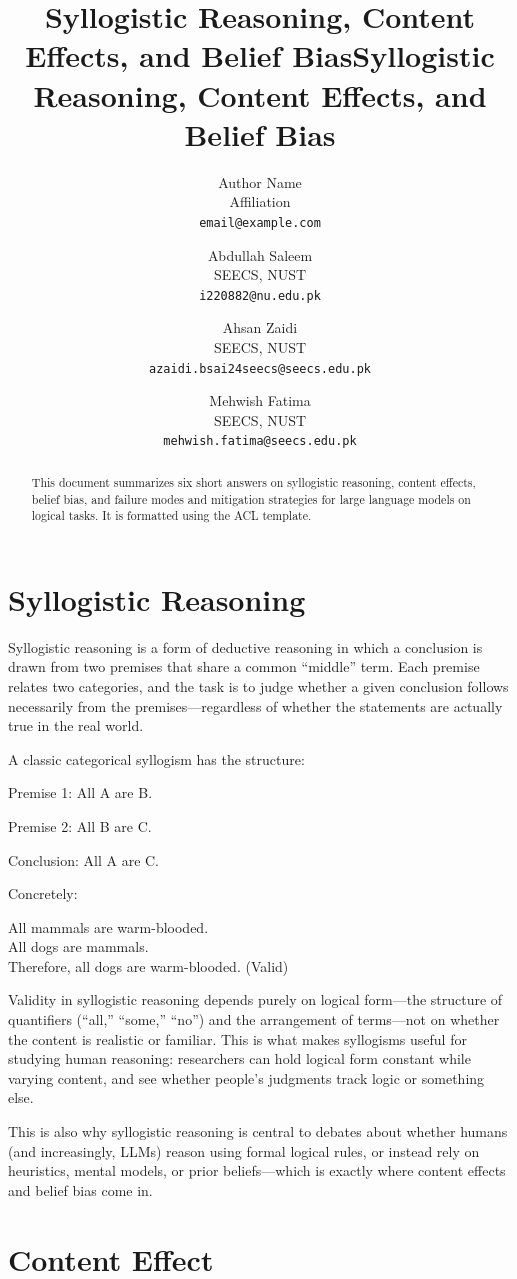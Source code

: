 \documentclass[11pt]{article}
\title{Syllogistic Reasoning, Content Effects, and Belief Bias}
\author{Author Name \\
	Affiliation \\
	\texttt{email@example.com}}
\title{Syllogistic Reasoning, Content Effects, and Belief Bias}
\author{Abdullah Saleem \\
	SEECS, NUST \\
	\texttt{i220882@nu.edu.pk}
	\and
	Ahsan Zaidi \\
	SEECS, NUST \\
	\texttt{azaidi.bsai24seecs@seecs.edu.pk}
	\and
	Mehwish Fatima \\
	SEECS, NUST \\
	\texttt{mehwish.fatima@seecs.edu.pk}}
\date{}
\begin{document}
\maketitle

\begin{abstract}
This document summarizes six short answers on syllogistic reasoning, content effects, belief bias, and failure modes and mitigation strategies for large language models on logical tasks. It is formatted using the ACL template.
\end{abstract}

\section{Syllogistic Reasoning}

Syllogistic reasoning is a form of deductive reasoning in which a conclusion is drawn from two premises that share a common ``middle'' term. Each premise relates two categories, and the task is to judge whether a given conclusion follows necessarily from the premises---regardless of whether the statements are actually true in the real world.

A classic categorical syllogism has the structure:

Premise 1: All A are B.

Premise 2: All B are C.

Conclusion: All A are C.

Concretely:

All mammals are warm-blooded. \\
All dogs are mammals. \\
Therefore, all dogs are warm-blooded. (Valid)

Validity in syllogistic reasoning depends purely on logical form---the structure of quantifiers (``all,'' ``some,'' ``no'') and the arrangement of terms---not on whether the content is realistic or familiar. This is what makes syllogisms useful for studying human reasoning: researchers can hold logical form constant while varying content, and see whether people's judgments track logic or something else.

This is also why syllogistic reasoning is central to debates about whether humans (and increasingly, LLMs) reason using formal logical rules, or instead rely on heuristics, mental models, or prior beliefs---which is exactly where content effects and belief bias come in.

\section{Content Effect}
\end{document}
